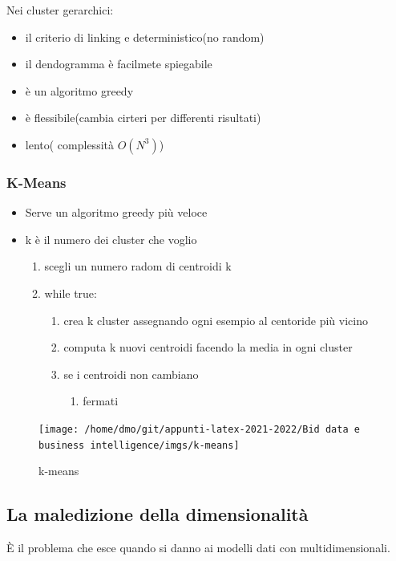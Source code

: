 Nei cluster gerarchici:
\begin{itemize}
    \item il criterio di linking e deterministico(no random)
    \item il dendogramma è facilmete spiegabile
    \item è un algoritmo greedy
    \item è flessibile(cambia cirteri per differenti risultati)
    \item lento( complessità $O(N^3)$)
\end{itemize}


\subsubsection{K-Means}
\begin{itemize}
    \item Serve un algoritmo greedy più veloce
    \item k è il numero dei cluster che voglio
    \begin{enumerate}
        \item scegli un numero radom di centroidi k
        \item while true:
        \begin{enumerate}
            \item crea k cluster assegnando ogni esempio al centoride più vicino
            \item computa k nuovi centroidi facendo la media in ogni cluster
            \item se i centroidi non cambiano
            \begin{enumerate}
                \item fermati
            \end{enumerate}
        \end{enumerate}
    \end{enumerate}
\end{itemize}
\begin{figure}[H]
    \centering
    \texttt{[image: /home/dmo/git/appunti-latex-2021-2022/Bid data e business intelligence/imgs/k-means]}
    \caption{k-means}
    \label{fig:k-means}
\end{figure}


\subsection{La maledizione della dimensionalità}
È il problema che esce quando si danno ai modelli dati con multidimensionali.

